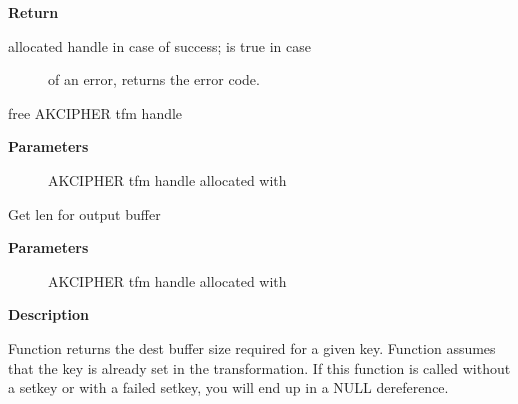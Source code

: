 \documentclass[a4paper,8pt,english]{sphinxmanual}
\begin{document}
\textbf{Return}
\begin{description}
\item[{allocated handle in case of success;  is true in case}] \leavevmode
of an error,  returns the error code.

\end{description}

\begin{fulllineitems}
\label{crypto/api-akcipher:c.crypto_free_akcipher}
free AKCIPHER tfm handle

\end{fulllineitems}


\textbf{Parameters}
\begin{description}
\item[{}] \leavevmode
AKCIPHER tfm handle allocated with {\hyperref[crypto/api\string-akcipher:c.crypto_alloc_akcipher]{}}

\end{description}

\begin{fulllineitems}
\label{crypto/api-akcipher:c.crypto_akcipher_maxsize}
Get len for output buffer

\end{fulllineitems}


\textbf{Parameters}
\begin{description}
\item[{}] \leavevmode
AKCIPHER tfm handle allocated with {\hyperref[crypto/api\string-akcipher:c.crypto_alloc_akcipher]{}}

\end{description}

\textbf{Description}

Function returns the dest buffer size required for a given key.
Function assumes that the key is already set in the transformation. If this
function is called without a setkey or with a failed setkey, you will end up
in a NULL dereference.
\end{document}
